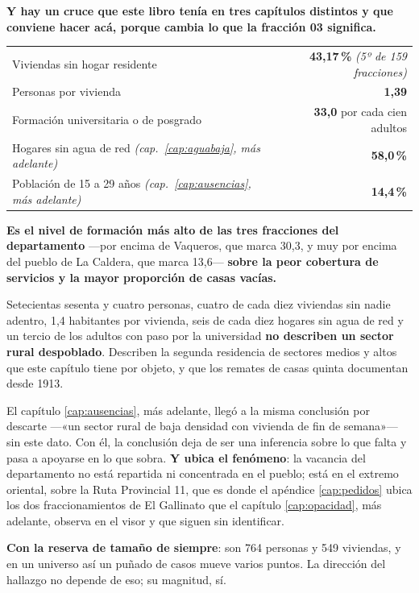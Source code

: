 \begin{cautela}
\textbf{Y hay un cruce que este libro tenía en tres capítulos distintos y que conviene hacer acá, porque cambia lo que la fracción 03 significa.}

\begin{center}\small
\begin{tabular}{@{}p{7.6cm}r@{}}
\toprule
Viviendas sin hogar residente & \textbf{43,17\,\%} \textit{(5º de 159 fracciones)} \\
Personas por vivienda & \textbf{1,39} \\
Formación universitaria o de posgrado & \textbf{33,0} por cada cien adultos \\
Hogares sin agua de red \textit{(cap.\ \ref{cap:aguabaja}, más adelante)} & \textbf{58,0\,\%} \\
Población de 15 a 29 años \textit{(cap.\ \ref{cap:ausencias}, más adelante)} & \textbf{14,4\,\%} \\
\bottomrule
\end{tabular}
\end{center}

\textbf{Es el nivel de formación más alto de las tres fracciones del departamento} ---por encima de Vaqueros, que marca 30,3, y muy por encima del pueblo de La Caldera, que marca 13,6--- \textbf{sobre la peor cobertura de servicios y la mayor proporción de casas vacías.}

Setecientas sesenta y cuatro personas, cuatro de cada diez viviendas sin nadie adentro, 1,4 habitantes por vivienda, seis de cada diez hogares sin agua de red y un tercio de los adultos con paso por la universidad \textbf{no describen un sector rural despoblado}. Describen la segunda residencia de sectores medios y altos que este capítulo tiene por objeto, y que los remates de casas quinta documentan desde 1913.

El capítulo \ref{cap:ausencias}, más adelante, llegó a la misma conclusión por descarte ---«un sector rural de baja densidad con vivienda de fin de semana»--- sin este dato. Con él, la conclusión deja de ser una inferencia sobre lo que falta y pasa a apoyarse en lo que sobra. \textbf{Y ubica el fenómeno}: la vacancia del departamento no está repartida ni concentrada en el pueblo; está en el extremo oriental, sobre la Ruta Provincial 11, que es donde el apéndice \ref{cap:pedidos} ubica los dos fraccionamientos de El Gallinato que el capítulo \ref{cap:opacidad}, más adelante, observa en el visor y que siguen sin identificar.

\textbf{Con la reserva de tamaño de siempre}: son 764 personas y 549 viviendas, y en un universo así un puñado de casos mueve varios puntos. La dirección del hallazgo no depende de eso; su magnitud, sí.
\end{cautela}

